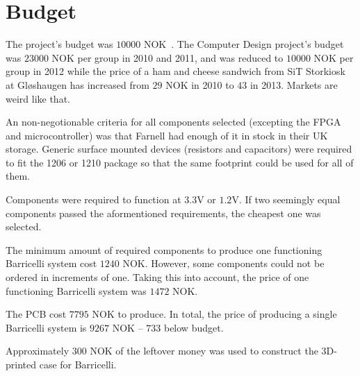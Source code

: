 \section{Budget}
The project's budget was $10 000$ NOK~\cite{assignment-text}.
The Computer Design project's budget was $23000$ NOK per group in 2010 and 2011, and was reduced to $10 000$ NOK per group in 2012\cite{previous-projects} while the price of a ham and cheese sandwich from SiT Storkiosk at Gløshaugen has increased from $29$ NOK in 2010 to $43$ in 2013.
Markets are weird like that.

An non-negotionable criteria for all components selected (excepting the FPGA and microcontroller) was that Farnell had enough of it in stock in their UK storage.
Generic surface mounted devices (resistors and capacitors) were required to fit the 1206 or 1210 package so that the same footprint could be used for all of them.

Components were required to function at $3.3$V or $1.2$V.
If two seemingly equal components passed the aformentioned requirements, the cheapest one was selected.

The minimum amount of required components to produce one functioning Barricelli system cost $1240$ NOK.
However, some components could not be ordered in increments of one.
Taking this into account, the price of one functioning Barricelli system was $1472$ NOK.

The PCB cost $7795$ NOK to produce.
In total, the price of producing a single Barricelli system is $9267$ NOK -- $733$ below budget.

Approximately $300$ NOK of the leftover money was used to construct the 3D-printed case for Barricelli.


